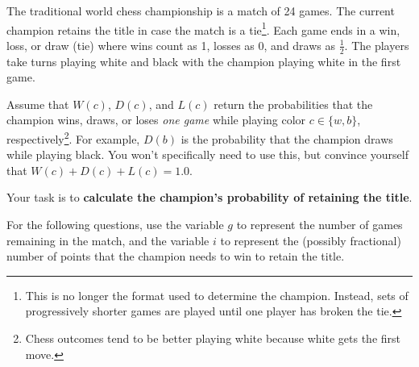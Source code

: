 \documentclass[12pt]{exam}
\newcommand{\stars}[1]{%
    \foreach \n in {1,...,#1}{%
        $\filledstar$%
    }%
}
\begin{document}
\begin{questions}

    \question[55] [W9, \stars{5}] The traditional world chess championship is a match of 24 games. The current champion retains the title in case the match is a tie\footnote{This is no longer the format used to determine the champion. Instead, sets of progressively shorter games are played until one player has broken the tie.}. Each game ends in a win, loss, or draw (tie) where wins count as 1, losses as 0, and draws as $\frac{1}{2}$. The players take turns playing white and black with the champion playing white in the first game.

    Assume that $W(c)$, $D(c)$, and $L(c)$ return the probabilities that the champion wins, draws, or loses {\em one game} while playing color $c \in \{w, b\}$, respectively\footnote{Chess outcomes tend to be better playing white because white gets the first move.}. For example, $D(b)$ is the probability that the champion draws while playing black. You won't specifically need to use this, but convince yourself that $W(c) + D(c) + L(c) = 1.0$.

    Your task is to \textbf{calculate the champion's probability of retaining the title}.

    For the following questions, use the variable $g$ to represent the number of games remaining in the match, and the variable $i$ to represent the (possibly fractional) number of points that the champion needs to win to retain the title.

\end{questions}
\end{document}
